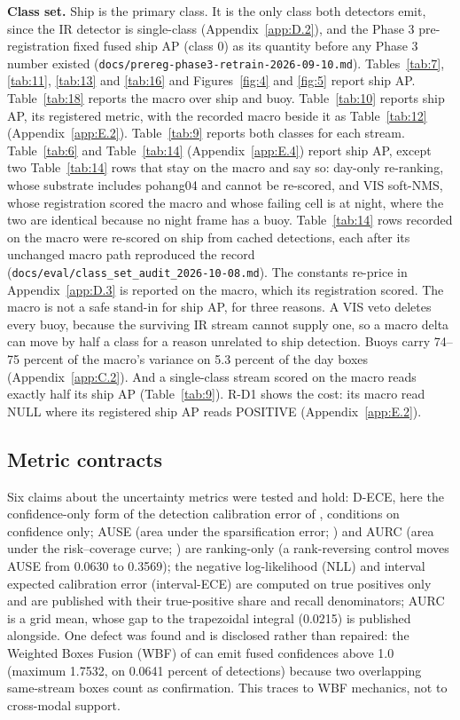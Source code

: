 \documentclass[10pt]{article}
\begin{document}
\textbf{Class set.} Ship is the primary class. It is the only class both detectors emit, since the IR detector is single-class (Appendix~\ref{app:D.2}), and the Phase 3 pre-registration fixed fused ship AP (class 0) as its quantity before any Phase 3 number existed (\texttt{docs/\allowbreak{}prereg-phase3-retrain-2026-09-10.md}). Tables~\ref{tab:7}, \ref{tab:11}, \ref{tab:13} and \ref{tab:16} and Figures~\ref{fig:4} and \ref{fig:5} report ship AP. Table~\ref{tab:18} reports the macro over ship and buoy. Table~\ref{tab:10} reports ship AP, its registered metric, with the recorded macro beside it as Table~\ref{tab:12} (Appendix~\ref{app:E.2}). Table~\ref{tab:9} reports both classes for each stream. Table~\ref{tab:6} and Table~\ref{tab:14} (Appendix~\ref{app:E.4}) report ship AP, except two Table~\ref{tab:14} rows that stay on the macro and say so: day-only re-ranking, whose substrate includes pohang04 and cannot be re-scored, and VIS soft-NMS, whose registration scored the macro and whose failing cell is at night, where the two are identical because no night frame has a buoy. Table~\ref{tab:14} rows recorded on the macro were re-scored on ship from cached detections, each after its unchanged macro path reproduced the record (\texttt{docs/\allowbreak{}eval/\allowbreak{}class\_\allowbreak{}set\_\allowbreak{}audit\_\allowbreak{}2026-10-08.md}). The constants re-price in Appendix~\ref{app:D.3} is reported on the macro, which its registration scored. The macro is not a safe stand-in for ship AP, for three reasons. A VIS veto deletes every buoy, because the surviving IR stream cannot supply one, so a macro delta can move by half a class for a reason unrelated to ship detection. Buoys carry 74--75 percent of the macro's variance on 5.3 percent of the day boxes (Appendix~\ref{app:C.2}). And a single-class stream scored on the macro reads exactly half its ship AP (Table~\ref{tab:9}). R-D1 shows the cost: its macro read NULL where its registered ship AP reads POSITIVE (Appendix~\ref{app:E.2}).

\subsection{Metric contracts}\label{app:C.5}
Six claims about the uncertainty metrics were tested and hold: D-ECE, here the confidence-only form of the detection calibration error of \citet{kuppers2020multivariate}, conditions on confidence only; AUSE (area under the sparsification error; \citealp{ilg2018uncertainty}) and AURC (area under the risk--coverage curve; \citealp{geifman2019biasreduced}) are ranking-only (a rank-reversing control moves AUSE from 0.0630 to 0.3569); the negative log-likelihood (NLL) and interval expected calibration error (interval-ECE) are computed on true positives only and are published with their true-positive share and recall denominators; AURC is a grid mean, whose gap to the trapezoidal integral (0.0215) is published alongside. One defect was found and is disclosed rather than repaired: the Weighted Boxes Fusion (WBF) of \citet{solovyev2021weighted} can emit fused confidences above 1.0 (maximum 1.7532, on 0.0641 percent of detections) because two overlapping same-stream boxes count as confirmation. This traces to WBF mechanics, not to cross-modal support.
\end{document}
